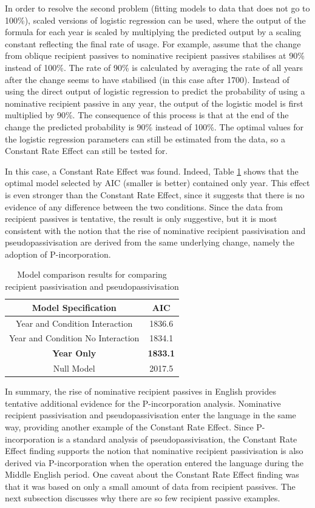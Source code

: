 	In order to resolve the second problem (fitting models to data that does not go to 100\%), scaled versions of logistic regression can be used, where the output of the formula for each year is scaled by multiplying the predicted output by a scaling constant reflecting the final rate of usage. For example, assume that the change from oblique recipient passives to nominative recipient passives stabilises at 90\% instead of 100\%. The rate of 90\% is calculated by averaging the rate of all years after the change seems to have stabilised (in this case after 1700). Instead of using the direct output of logistic regression to predict the probability of using a nominative recipient passive in any year, the output of the logistic model is first multiplied by 90\%. The consequence of this process is that at the end of the change the predicted probability is 90\% instead of 100\%. The optimal values for the logistic regression parameters can still be estimated from the data, so a Constant Rate Effect can still be tested for. 

	In this case, a Constant Rate Effect was found. Indeed, Table \ref{tab:pas-change-tab} shows that the optimal model selected by AIC (smaller is better) contained only year. This effect is even stronger than the Constant Rate Effect, since it suggests that there is no evidence of any difference between the two conditions. Since the data from recipient passives is tentative, the result is only suggestive, but it is most consistent with the notion that the rise of nominative recipient passivisation and pseudopassivisation are derived from the same underlying change, namely the adoption of P-incorporation.

	\begin{table}[h!]
		\begin{tabular}{cc}
		Model Specification & AIC\\
		\hline
		Year and Condition Interaction & 1836.6 \\
		Year and Condition No Interaction & 1834.1 \\
		\textbf{Year Only} & \textbf{1833.1} \\
		Null Model & 2017.5 \\
		\end{tabular}
		\caption{\label{tab:pas-change-tab}Model comparison results for comparing recipient passivisation and pseudopassivisation}
	\end{table}

	In summary, the rise of nominative recipient passives in English provides tentative additional evidence for the P-incorporation analysis. Nominative recipient passivisation and pseudopassivisation enter the language in the same way, providing another example of the Constant Rate Effect. Since P-incorporation is a standard analysis of pseudopassivisation, the Constant Rate Effect finding supports the notion that nominative recipient passivisation is also derived via P-incorporation when the operation entered the language during the Middle English period. One caveat about the Constant Rate Effect finding was that it was based on only a small amount of data from recipient passives. The next subsection discusses why there are so few recipient passive examples.


